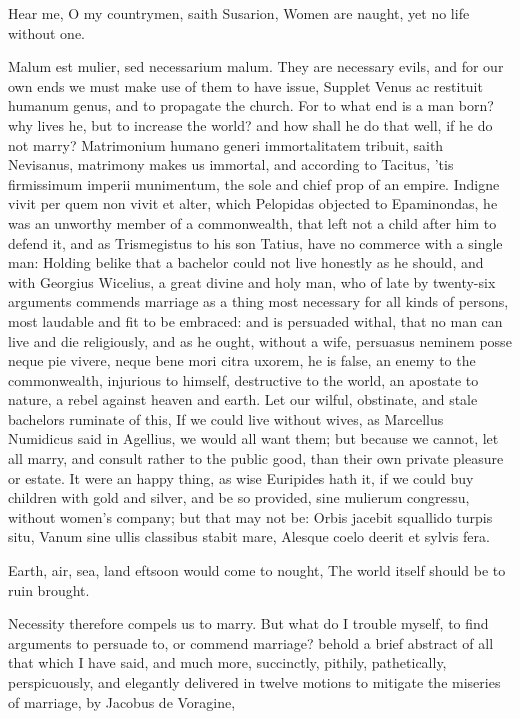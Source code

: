 {Hear me, O my countrymen, saith Susarion,
Women are naught, yet no life without one.

Malum est mulier, sed necessarium malum. They are necessary
evils, and for our own ends we must make use of them to have issue,
 Supplet Venus ac restituit humanum genus, and to propagate the
church. For to what end is a man born? why lives he, but to increase
the world? and how shall he do that well, if he do not marry?
Matrimonium humano generi immortalitatem tribuit, saith Nevisanus,
matrimony makes us immortal, and according to Tacitus, 'tis
firmissimum imperii munimentum, the sole and chief prop of an empire.
Indigne vivit per quem non vivit et alter, which Pelopidas
objected to Epaminondas, he was an unworthy member of a commonwealth,
that left not a child after him to defend it, and as Trismegistus
to his son Tatius, have no commerce with a single man: Holding belike
that a bachelor could not live honestly as he should, and with Georgius
Wicelius, a great divine and holy man, who of late by twenty-six
arguments commends marriage as a thing most necessary for all kinds of
persons, most laudable and fit to be embraced: and is persuaded withal,
that no man can live and die religiously, and as he ought, without a
wife, persuasus neminem posse neque pie vivere, neque bene mori citra
uxorem, he is false, an enemy to the commonwealth, injurious to
himself, destructive to the world, an apostate to nature, a rebel
against heaven and earth. Let our wilful, obstinate, and stale
bachelors ruminate of this, If we could live without wives, as
Marcellus Numidicus said in  Agellius, we would all want them;
but because we cannot, let all marry, and consult rather to the public
good, than their own private pleasure or estate. It were an happy
thing, as wise Euripides hath it, if we could buy children with
gold and silver, and be so provided, sine mulierum congressu, without
women's company; but that may not be:
Orbis jacebit squallido turpis situ,
Vanum sine ullis classibus stabit mare,
Alesque coelo deerit et sylvis fera.

Earth, air, sea, land eftsoon would come to nought,
The world itself should be to ruin brought.

Necessity therefore compels us to marry.
But what do I trouble myself, to find arguments to persuade to, or
commend marriage? behold a brief abstract of all that which I have
said, and much more, succinctly, pithily, pathetically, perspicuously,
and elegantly delivered in twelve motions to mitigate the miseries of
marriage, by  Jacobus de Voragine,

}
